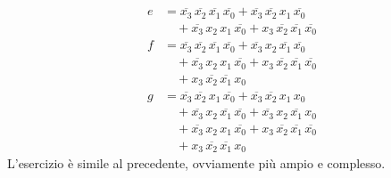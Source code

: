 \documentclass[12pt,a4paper]{article}
\begin{document}
\[\begin{aligned}
    e &= \overline{x_3}\,\overline{x_2}\,\overline{x_1}\,\overline{x_0}
    + \overline{x_3}\,\overline{x_2}\,x_1\,\overline{x_0} \\
    &\quad + \overline{x_3}\,x_2\,x_1\,\overline{x_0}
    + x_3\,\overline{x_2}\,\overline{x_1}\,\overline{x_0} \\[4pt]
    f &= \overline{x_3}\,\overline{x_2}\,\overline{x_1}\,\overline{x_0}
    + \overline{x_3}\,x_2\,\overline{x_1}\,\overline{x_0} \\
    &\quad + \overline{x_3}\,x_2\,x_1\,\overline{x_0}
    + x_3\,\overline{x_2}\,\overline{x_1}\,\overline{x_0} \\
    &\quad + x_3\,\overline{x_2}\,\overline{x_1}\,x_0 \\[4pt]
    g &= \overline{x_3}\,\overline{x_2}\,x_1\,\overline{x_0}
    + \overline{x_3}\,\overline{x_2}\,x_1\,x_0 \\
    &\quad + \overline{x_3}\,x_2\,\overline{x_1}\,\overline{x_0}
    + \overline{x_3}\,x_2\,\overline{x_1}\,x_0 \\
    &\quad + \overline{x_3}\,x_2\,x_1\,\overline{x_0}
    + x_3\,\overline{x_2}\,\overline{x_1}\,\overline{x_0} \\
    &\quad + x_3\,\overline{x_2}\,\overline{x_1}\,x_0
\end{aligned}
\]
L'esercizio è simile al precedente, ovviamente più ampio e complesso.\\
\end{document}
